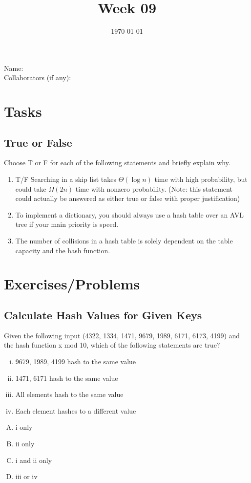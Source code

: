 \documentclass[12pt]{amsart}
\title{Week 09}
\date{\today}
\begin{document}
\maketitle


Name: 
\\

Collaborators (if any): 

\section{Tasks}

\subsection{True or False}
Choose T or F for each of the following statements and briefly explain why.  
\begin{enumerate}
\item T/F Searching in a skip list takes $\Theta (\log n)$ time with high probability, but
could take $\Omega (2n)$ time with nonzero probability.  (Note: this statement could actually be answered as either true or false with proper justification) 
\item To implement a dictionary, you should always use a hash table over an AVL tree if your main priority is speed.
\item The number of collisions in a hash table is solely dependent on the table capacity and the hash function.
\end{enumerate}

\section{Exercises/Problems}

\subsection{Calculate Hash Values for Given Keys} 
Given the following input (4322, 1334, 1471, 9679, 1989, 6171, 6173, 4199) and the hash function x mod 10, which of the following statements are true? 
\begin{enumerate}[i.]
\item 9679, 1989, 4199 hash to the same value
\item 1471, 6171 hash to the same value
\item All elements hash to the same value
\item Each element hashes to a different value 
\end{enumerate}
\begin{enumerate}[(A)]
\item i only
\item ii only 
\item i and ii only
\item iii or iv 
\end{enumerate}
\end{document}
